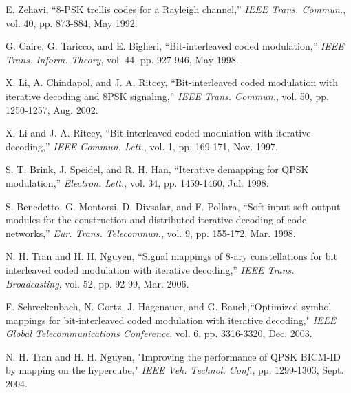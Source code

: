\documentclass[12pt, draftclsnofoot, onecolumn]{IEEEtran}
\begin{document}
\begin{thebibliography}{bl}

 E. Zehavi, \newblock ``8-PSK trellis codes for a Rayleigh channel,'' \newblock \emph {IEEE Trans. Commun.}, vol. 40,  pp. 873-884, May 1992.

 G. Caire, G. Taricco, and E. Biglieri, \newblock  ``Bit-interleaved coded modulation,'' \newblock \emph{IEEE Trans. Inform. Theory}, vol. 44, pp. 927-946, May 1998.

 X. Li,  A. Chindapol, and J. A. Ritcey, ``Bit-interleaved coded modulation with iterative decoding and 8PSK signaling,” \newblock \emph {IEEE Trans. Commun.}, vol. 50, pp. 1250-1257, Aug. 2002.


 X. Li and J. A. Ritcey, \newblock  ``Bit-interleaved coded modulation with iterative decoding,'' \newblock \emph{IEEE Commun. Lett.}, vol. 1, pp. 169-171, Nov. 1997.

 S. T. Brink, J. Speidel, and R. H. Han,  \newblock ``Iterative demapping for QPSK
modulation,'' \newblock \emph{Electron. Lett.}, vol. 34, pp. 1459-1460, Jul. 1998.

 S. Benedetto, G. Montorsi, D. Divsalar,  and F. Pollara,
 \newblock ``Soft-input soft-output modules for the construction and distributed iterative decoding
of code networks,'' \newblock \emph{Eur. Trans. Telecommun.}, vol. 9,  pp. 155-172, Mar. 1998.

 N. H. Tran and H. H. Nguyen, \newblock ``Signal mappings of 8-ary constellations for bit interleaved coded modulation with iterative decoding,'' \newblock \emph {IEEE Trans. Broadcasting}, vol. 52,  pp. 92-99, Mar. 2006.


 F. Schreckenbach, N. Gortz, J. Hagenauer, and G. Bauch,``Optimized symbol mappings for bit-interleaved coded modulation with iterative decoding," \newblock \emph {IEEE Global Telecommunications Conference}, vol. 6, pp. 3316-3320, Dec. 2003.

N. H. Tran and H. H. Nguyen, "Improving the performance of QPSK BICM-ID by mapping on the hypercube," \newblock \emph {IEEE Veh.
Technol. Conf.}, pp. 1299-1303, Sept. 2004.


\end{thebibliography}
\end{document}
